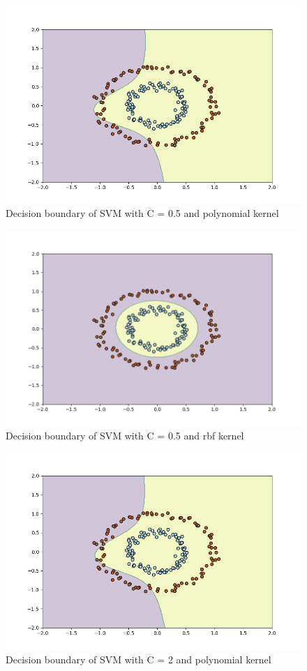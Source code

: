 \documentclass[12pt,a4paper, margin=1in]{article}
\begin{document}
\begin{figure}
    \centering
    \includegraphics[scale=0.75]{svm-poly-05}
    \caption{Decision boundary of SVM with C = 0.5 and polynomial kernel}
\end{figure}
\begin{figure}
    \centering
    \includegraphics[scale=0.75]{svm-rbf-05}
    \caption{Decision boundary of SVM with C = 0.5 and rbf kernel}
\end{figure}
\begin{figure}
    \centering
    \includegraphics[scale=0.75]{svm-poly-2}
    \caption{Decision boundary of SVM with C = 2 and polynomial kernel}
\end{figure}
\end{document}
